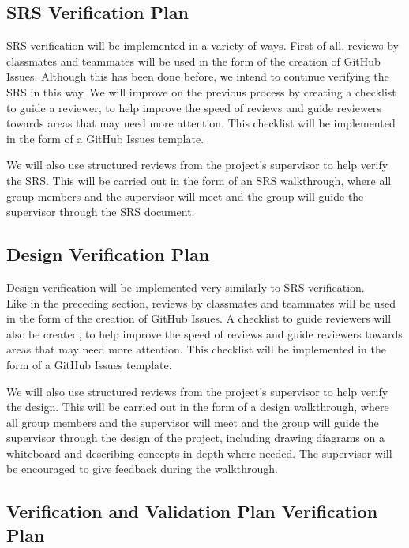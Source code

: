 \documentclass[12pt, titlepage]{article}
\begin{document}
\subsection{SRS Verification Plan}

SRS verification will be implemented in a variety of ways. First of all, reviews by classmates and teammates will be used in the form of the creation of GitHub Issues. Although this has been done before, we intend to continue verifying the SRS in this way. We will improve on the previous process by creating a checklist to guide a reviewer, to help improve the speed of reviews and guide reviewers towards areas that may need more attention. This checklist will be implemented in the form of a GitHub Issues template.

We will also use structured reviews from the project's supervisor to help verify the SRS. This will be carried out in the form of an SRS walkthrough, where all group members and the supervisor will meet and the group will guide the supervisor through the SRS document.

\subsection{Design Verification Plan}

Design verification will be implemented very similarly to SRS verification. \\
Like in the preceding section, reviews by classmates and teammates will be used in the form of the creation of GitHub Issues. A checklist to guide reviewers will also be created, to help improve the speed of reviews and guide reviewers towards areas that may need more attention. This checklist will be implemented in the form of a GitHub Issues template.

We will also use structured reviews from the project's supervisor to help verify the design. This will be carried out in the form of a design walkthrough, where all group members and the supervisor will meet and the group will guide the supervisor through the design of the project, including drawing diagrams on a whiteboard and describing concepts in-depth where needed. The supervisor will be encouraged to give feedback during the walkthrough.

\subsection{Verification and Validation Plan Verification Plan}
\end{document}
